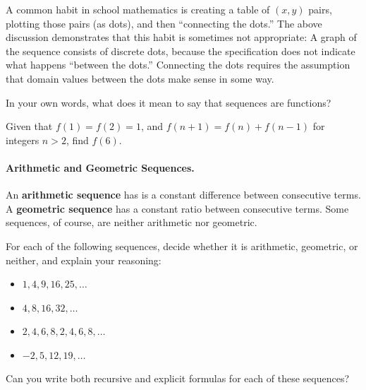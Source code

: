 A common habit in school mathematics is creating a table of $(x,y)$ pairs, plotting those pairs (as dots), and then ``connecting the dots.''  The above discussion demonstrates that this habit is sometimes not appropriate: A graph 
of the sequence consists of discrete dots, because the specification does not indicate what happens ``between the dots.''  Connecting the dots requires the assumption that domain values between the dots make sense in some way.  


\begin{question}
In your own words, what does it mean to say that sequences are functions?
\end{question}

\begin{question}
Given that $f(1) = f(2) = 1$, and $f(n+1) = f(n)+f(n-1)$ for integers $n>2$, find $f(6)$.  
\end{question}

\paragraph{Arithmetic and Geometric Sequences.}  
\begin{definition}
An \textbf{arithmetic sequence} has is a constant difference between consecutive terms.  A \textbf{geometric sequence} has a constant ratio between consecutive terms.  Some sequences, of course, are neither arithmetic nor geometric.
\end{definition}
\begin{question}
For each of the following sequences, decide whether it is arithmetic, geometric, or neither, and explain your reasoning:
\begin{itemize}  
\item $1, 4, 9, 16, 25, \dots$
\item $4, 8, 16, 32, \dots$
\item $2, 4, 6, 8, 2, 4, 6, 8, \dots$
\item $-2, 5, 12, 19, \dots$
\end{itemize}
Can you write both recursive and explicit formulas for each of these sequences?  
\end{question}

